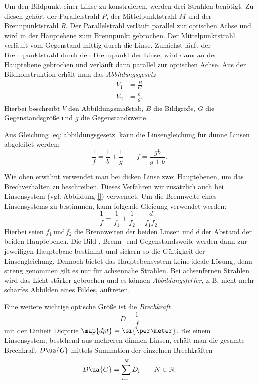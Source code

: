 Um den Bildpunkt einer Linse zu konstruieren, werden drei Strahlen benötigt.
Zu diesen gehört der Parallelstrahl $P$, der Mittelpunktstrahl $M$ und der
Brennpunktstrahl $B$.
Der Parallelstrahl verläuft parallel zur optischen Achse und wird in der Hauptebene
zum Brennpunkt gebrochen. Der Mittelpunktstrahl verläuft vom Gegenstand mittig durch die
Linse. Zunächst läuft der Brennpunktstrahl durch den Brennpunkt der Linse, wird dann
an der Hauptebene gebrochen und verläuft dann parallel zur optischen Achse.
Aus der Bildkonstruktion erhält man das \emph{Abbildungsgesetz}
\begin{align}
  V_1&=\frac{B}{G} \label{eq: abbildungsgesetz_gross} \\
  V_2&=\frac{b}{g} \label{eq: abbildungsgesetz_klein}.
\end{align}
Hierbei beschreibt $V$ den Abbildungsmaßstab, $B$ die Bildgröße, $G$ die Gegenstandsgröße
und $g$ die Gegenstandsweite.

Aus Gleichung \eqref{eq: abbildungsgesetz} kann die Linsengleichung für dünne Linsen abgeleitet werden:
\begin{equation}
  \label{eq: linsengleichung}
  \frac{1}{f}= \frac{1}{b}+  \frac{1}{g} \qquad f= \frac{gb}{g+b}.
\end{equation}

Wie oben erwähnt verwendet man bei dicken Linse zwei Hauptebenen, um das Brechverhalten
zu beschreiben. Dieses Verfahren wir zusätzlich auch bei Linsensystem (vgl. Abbildung \ref{}) verwendet.
Um die Brennweite eines Linsensystems zu bestimmen, kann folgende Gleicung verwendet werden:
\begin{equation}
  \label{eq: gleichung_linsensystem}
  \frac{1}{f}=\frac{1}{f_1}+\frac{1}{f_2}-\frac{d}{f_1f_2}.
\end{equation}
Hierbei seien $f_1 \, \text{und} \, f_2$ die Brennweiten der beiden Linsen und $d$ der
Abstand der beiden Hauptebenen.
Die Bild-, Brenn- und Gegenstandsweite werden dann zur jeweiligen Hauptebene
bestimmt und sichern so die Gültigkeit der Linsengleichung.
Dennoch bietet das Hauptebensystem keine ideale Lösung, denn streng genommen
gilt es nur für achsennahe Strahlen. Bei achsenfernen Strahlen wird das Licht stärker
gebrochen und es können \emph{Abbildungsfehler}, z.\,B. nicht mehr scharfes Abbilden eines Bildes,
auftreten.

Eine weitere wichtige optische Größe ist die \emph{Brechkraft}
\begin{equation}
  \label{eq: brechkraft}
  D=\frac{1}{f}
\end{equation}
mit der Einheit Dioptrie $\map{dpt}=\si{\per \meter}$.
Bei einem Linsensystem, bestehend aus mehreren dünnen Linsen, erhält man die gesamte
Brechkraft $D\ua{G}$ mittels Summation der einzelnen Brechkräften
\begin{equation*}
  D\ua{G}=\sum_{i=1}^{N}D_i \qquad N\in\mathbb{N}.
\end{equation*}
